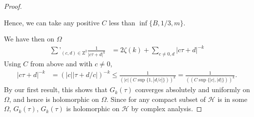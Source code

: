 \documentclass[11pt]{article}
\theoremstyle{definition}
\theoremstyle{example}
\theoremstyle{remark}
\theoremstyle{lemma}
\theoremstyle{proposition}
\theoremstyle{Problem}
\theoremstyle{Solution}
\theoremstyle{theorem}
\theoremstyle{corollary}
\begin{document}
\begin{proof}
\begin{enumerate}
\end{enumerate}

Hence, we can take any positive $C$ less than $\inf \{B, 1 / 3, m\}$.

We have then on $\Omega$ \begin{align*}
\sum’_{(c,d)\in \mathrm{Z}^2}\frac{1}{|c\tau +d|^k}&=2\zeta (k)+\sum_{c \neq 0, d}|c \tau+d|^{-k}
\end{align*}
Using $C$ from above and with $c\neq0$, \begin{align*} |c \tau+d|^{-k}&=(|c||\tau+d/c|)^{-k}\leq \frac{1}{(|c|(C\sup\{1,|d/c|\}))^{k}}=\frac{1}{((C\sup\{|c|,|d|\}))^{k}}.
\end{align*}
By our first result, this shows that $G_k(\tau)$ converges absolutely and uniformly on $\Omega$, and hence is holomorphic on $\Omega$. Since for any compact subset of $\mathcal{H}$ is in some $\Omega$, $G_k(\tau)$, $G_k(\tau)$ is holomorphic on $\mathcal{H}$ by complex analysis. 
\end{proof}
\end{document}
